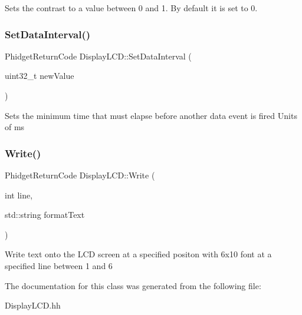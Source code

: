 Sets the contrast to a value between 0 and 1. By default it is set to 0.\mbox{\label{classDisplayLCD_a07fef3e48aaccd4c66931ee886945e5d}} 
\subsubsection{\texorpdfstring{Set\+Data\+Interval()}{SetDataInterval()}}
{\footnotesize\ttfamily Phidget\+Return\+Code Display\+L\+C\+D\+::\+Set\+Data\+Interval (\begin{DoxyParamCaption}\item[{uint32\+\_\+t}]{new\+Value }\end{DoxyParamCaption})\hspace{0.3cm}{\ttfamily [inline]}}

Sets the minimum time that must elapse before another data event is fired Units of ms\mbox{\label{classDisplayLCD_ab8c5e288a7ce5c0dde1806f821036bac}} 
\subsubsection{\texorpdfstring{Write()}{Write()}}
{\footnotesize\ttfamily Phidget\+Return\+Code Display\+L\+C\+D\+::\+Write (\begin{DoxyParamCaption}\item[{int}]{line,  }\item[{std\+::string}]{format\+Text }\end{DoxyParamCaption})\hspace{0.3cm}{\ttfamily [inline]}}

Write text onto the L\+CD screen at a specified positon with 6x10 font at a specified line between 1 and 6

The documentation for this class was generated from the following file\+:\begin{DoxyCompactItemize}
\item 
Display\+L\+C\+D.\+hh\end{DoxyCompactItemize}
